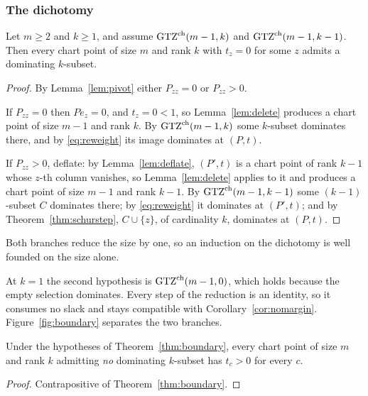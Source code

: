 \subsubsection*{The dichotomy}

\begin{theorem}[Lean]\label{thm:boundary}
Let $m\ge2$ and $k\ge1$, and assume $\mathrm{GTZ}^{\mathrm{ch}}(m-1,k)$ and
$\mathrm{GTZ}^{\mathrm{ch}}(m-1,k-1)$.  Then every chart point of size $m$ and
rank $k$ with $t_z=0$ for some $z$ admits a dominating $k$-subset.
\end{theorem}

\begin{proof}
By Lemma~\ref{lem:pivot} either $P_{zz}=0$ or $P_{zz}>0$.

If $P_{zz}=0$ then $Pe_z=0$, and $t_z=0<1$, so Lemma~\ref{lem:delete}
produces a chart point of size $m-1$ and rank $k$.  By
$\mathrm{GTZ}^{\mathrm{ch}}(m-1,k)$ some $k$-subset dominates there, and by
\eqref{eq:reweight} its image dominates at $(P,t)$.

If $P_{zz}>0$, deflate: by Lemma~\ref{lem:deflate}, $(P',t)$ is a chart
point of rank $k-1$ whose $z$-th column vanishes, so
Lemma~\ref{lem:delete} applies to it and produces a chart point of size
$m-1$ and rank $k-1$.  By $\mathrm{GTZ}^{\mathrm{ch}}(m-1,k-1)$ some
$(k-1)$-subset $C$ dominates there; by \eqref{eq:reweight} it dominates
at $(P',t)$; and by Theorem~\ref{thm:schurstep}, $C\cup\{z\}$, of
cardinality $k$, dominates at $(P,t)$.
\end{proof}

Both branches reduce the size by one, so an induction on the dichotomy is
well founded on the size alone.

At $k=1$ the second hypothesis is
$\mathrm{GTZ}^{\mathrm{ch}}(m-1,0)$, which holds because the empty selection
dominates.  Every step of the reduction is an identity, so it consumes no
slack and stays compatible with Corollary~\ref{cor:nomargin}.
Figure~\ref{fig:boundary} separates the two branches.

\begin{corollary}[Lean]\label{cor:interiorcex}
Under the hypotheses of Theorem~\ref{thm:boundary}, every chart point of
size $m$ and rank $k$ admitting \emph{no} dominating $k$-subset has
$t_c>0$ for every $c$.
\end{corollary}

\begin{proof}
Contrapositive of Theorem~\ref{thm:boundary}.
\end{proof}

